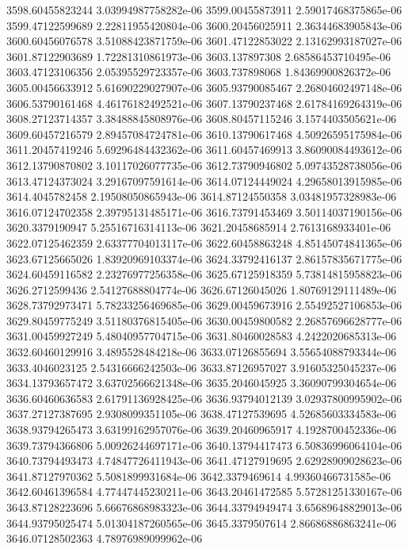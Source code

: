 {3598.60455823244 3.03994987758282e-06
3599.00455873911 2.59017468375865e-06
3599.47122599689 2.22811955420804e-06
3600.20456025911 2.36344683905843e-06
3600.60456076578 3.51088423871759e-06
3601.47122853022 2.13162993187027e-06
3601.87122903689 1.72281310861973e-06
3603.137897308 2.68586453710495e-06
3603.47123106356 2.05395529723357e-06
3603.737898068 1.84369900826372e-06
3605.00456633912 5.61690229027907e-06
3605.93790085467 2.26804602497148e-06
3606.53790161468 4.46176182492521e-06
3607.13790237468 2.61784169264319e-06
3608.27123714357 3.38488845808976e-06
3608.80457115246 3.1574403505621e-06
3609.60457216579 2.89457084724781e-06
3610.13790617468 4.50926595175984e-06
3611.20457419246 5.69296484432362e-06
3611.60457469913 3.86090084493612e-06
3612.13790870802 3.10117026077735e-06
3612.73790946802 5.09743528738056e-06
3613.47124373024 3.29167097591614e-06
3614.07124449024 4.29658013915985e-06
3614.4045782458 2.19508050865943e-06
3614.87124550358 3.03481957328983e-06
3616.07124702358 2.39795131485171e-06
3616.73791453469 3.50114037190156e-06
3620.3379190947 5.25516716314113e-06
3621.20458685914 2.7613168933401e-06
3622.07125462359 2.63377704013117e-06
3622.60458863248 4.85145074841365e-06
3623.67125665026 1.83920969103374e-06
3624.33792416137 2.86157835671775e-06
3624.60459116582 2.23276977256358e-06
3625.67125918359 5.73814815958823e-06
3626.2712599436 2.54127688804774e-06
3626.67126045026 1.80769129111489e-06
3628.73792973471 5.78233256469685e-06
3629.00459673916 2.55492527106853e-06
3629.80459775249 3.51180376815405e-06
3630.00459800582 2.26857696628777e-06
3631.00459927249 5.48040957704715e-06
3631.80460028583 4.2422020685313e-06
3632.60460129916 3.4895528484218e-06
3633.07126855694 3.55654088793344e-06
3633.4046023125 2.54316666242503e-06
3633.87126957027 3.91605325045237e-06
3634.13793657472 3.63702566621348e-06
3635.2046045925 3.36090799304654e-06
3636.60460636583 2.61791136928425e-06
3636.93794012139 3.02937800995902e-06
3637.27127387695 2.9308099351105e-06
3638.47127539695 4.52685603334583e-06
3638.93794265473 3.63199162957076e-06
3639.20460965917 4.1928700452336e-06
3639.73794366806 5.00926244697171e-06
3640.13794417473 6.50836996064104e-06
3640.73794493473 4.74847726411943e-06
3641.47127919695 2.62928909028623e-06
3641.87127970362 5.5081899931684e-06
3642.3379469614 4.99360466731585e-06
3642.60461396584 4.77447445230211e-06
3643.20461472585 5.57281251330167e-06
3643.87128223696 5.66676868983323e-06
3644.33794949474 3.65689648829013e-06
3644.93795025474 5.01304187260565e-06
3645.3379507614 2.86686886863241e-06
3646.07128502363 4.78976989099962e-06
}
